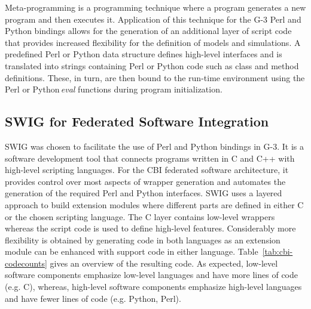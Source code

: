 \documentclass[12pt]{article}
\begin{document}
Meta-programming is a programming technique where a program generates
a new program and then executes it.  Application of this technique for
the G-3 Perl and Python bindings allows for the generation of an
additional layer of script code that provides increased flexibility
for the definition of models and simulations.  A predefined Perl or
Python data structure defines high-level interfaces and is translated
into strings containing Perl or Python code such as class and method
definitions.  These, in turn, are then bound to the run-time
environment using the Perl or Python\,{\it eval} functions during
program initialization.

\subsection{SWIG for Federated Software Integration}

SWIG was chosen to facilitate the use of Perl and Python bindings in
G-3. It is a software development tool that connects programs written
in C and C++ with high-level scripting languages. For the CBI federated software
architecture, it provides control over most aspects of wrapper
generation and automates the generation of the required Perl and
Python interfaces. SWIG uses a layered approach to build extension
modules where different parts are defined in either C or the chosen
scripting language. The C layer contains low-level wrappers whereas
the script code is used to define high-level features.  Considerably
more flexibility is obtained by generating code in both languages as
an extension module can be enhanced with support code in either
language.  Table~\ref{tab:cbi-codecounts} gives an overview of the
resulting code.  As expected, low-level software components emphasize
low-level languages and have more lines of code (e.g. C), whereas, high-level
software components emphasize high-level languages and have fewer
lines of code (e.g. Python, Perl).
\end{document}
